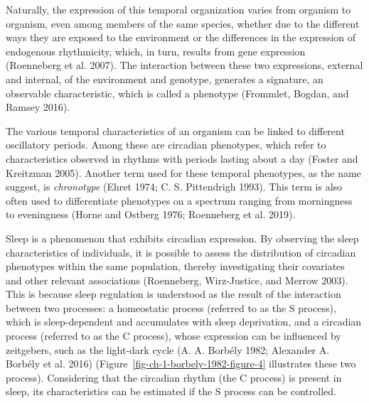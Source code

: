 \documentclass[
  12pt,
  a4paper,
  oneside]{tesesusp}
\begin{document}
Naturally, the expression of this temporal organization varies from
organism to organism, even among members of the same species, whether
due to the different ways they are exposed to the environment or the
differences in the expression of endogenous rhythmicity, which, in turn,
results from gene expression (Roenneberg et al. 2007). The interaction
between these two expressions, external and internal, of the environment
and genotype, generates a signature, an observable characteristic, which
is called a phenotype (Frommlet, Bogdan, and Ramsey 2016).

The various temporal characteristics of an organism can be linked to
different oscillatory periods. Among these are circadian phenotypes,
which refer to characteristics observed in rhythms with periods lasting
about a day (Foster and Kreitzman 2005). Another term used for these
temporal phenotypes, as the name suggest, is \emph{chronotype} (Ehret
1974; C. S. Pittendrigh 1993). This term is also often used to
differentiate phenotypes on a spectrum ranging from morningness to
eveningness (Horne and Ostberg 1976; Roenneberg et al. 2019).

Sleep is a phenomenon that exhibits circadian expression. By observing
the sleep characteristics of individuals, it is possible to assess the
distribution of circadian phenotypes within the same population, thereby
investigating their covariates and other relevant associations
(Roenneberg, Wirz-Justice, and Merrow 2003). This is because sleep
regulation is understood as the result of the interaction between two
processes: a homeostatic process (referred to as the \(\text{S}\)
process), which is sleep-dependent and accumulates with sleep
deprivation, and a circadian process (referred to as the \(\text{C}\)
process), whose expression can be influenced by zeitgebers, such as the
light-dark cycle (A. A. Borbély 1982; Alexander A. Borbély et al. 2016)
(Figure~\ref{fig-ch-1-borbely-1982-figure-4} illustrates these two
process). Considering that the circadian rhythm (the \(\text{C}\)
process) is present in sleep, its characteristics can be estimated if
the \(\text{S}\) process can be controlled.

\vspace{10pt}
\end{document}
